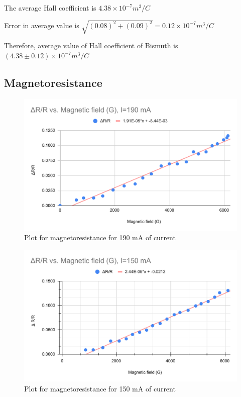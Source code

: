 \documentclass[a4paper, amsfonts, amssymb, amsmath, reprint, showkeys, nofootinbib, twoside]{revtex4-1}
\begin{document}
The average Hall coefficient is $4.38 \times10^{-7} m^3/C$

Error in average value is $\sqrt{(0.08)^2+(0.09)^2}=0.12 \times10^{-7} m^3/C$

Therefore, average value of  Hall coefficient of Bismuth is $(4.38\pm0.12) \times10^{-7} m^3/C$

\subsection{Magnetoresistance}
\begin{figure}[H]
	\centering
	\includegraphics[scale=0.4]{9} 
	\caption{Plot for magnetoresistance for 190 mA of current}
	\label{2}
\end{figure}

\begin{figure}[H]
	\centering
	\includegraphics[scale=0.4]{10} 
	\caption{Plot for magnetoresistance for 150 mA of current}
	\label{2}
\end{figure}
\end{document}
